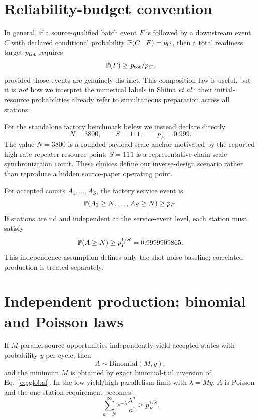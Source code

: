 \documentclass[aps,prx,reprint,superscriptaddress,nofootinbib,longbibliography,floatfix]{revtex4-2}
\begin{document}
\section{Reliability-budget convention}
In general, if a source-qualified batch event $F$ is followed by a downstream event $C$ with declared conditional probability $\mathbb P(C\mid F)=p_C$, then a total readiness target $p_{\rm tot}$ requires
\begin{equation}
\mathbb P(F)\ge p_{\rm tot}/p_C,
\end{equation}
provided those events are genuinely distinct. This composition law is useful, but it is \emph{not} how we interpret the numerical labels in Shiina \emph{et al.}: their initial-resource probabilities already refer to simultaneous preparation across all stations.

For the standalone factory benchmark below we instead declare directly
\begin{equation}
N=3800,\qquad S=111,\qquad p_F=0.999.
\end{equation}
The value $N=3800$ is a rounded payload-scale anchor motivated by the reported high-rate repeater resource point; $S=111$ is a representative chain-scale synchronization count. These choices define our inverse-design scenario rather than reproduce a hidden source-paper operating point.

For accepted counts $A_1,\ldots,A_S$, the factory service event is
\begin{equation}
\mathbb P(A_1\ge N,\ldots,A_S\ge N)\ge p_F.
\label{eq:global}
\end{equation}
If stations are iid and independent at the service-event level, each station must satisfy
\begin{equation}
\mathbb P(A\ge N)\ge p_F^{1/S}=0.9999909865.
\end{equation}
This independence assumption defines only the shot-noise baseline; correlated production is treated separately.

\section{Independent production: binomial and Poisson laws}
If $M$ parallel source opportunities independently yield accepted states with probability $y$ per cycle, then
\begin{equation}
A\sim\mathrm{Binomial}(M,y),
\end{equation}
and the minimum $M$ is obtained by exact binomial-tail inversion of Eq.~\eqref{eq:global}. In the low-yield/high-parallelism limit with $\lambda=My$, $A$ is Poisson and the one-station requirement becomes
\begin{equation}
\sum_{a=N}^{\infty}e^{-\lambda}\frac{\lambda^a}{a!}\ge p_F^{1/S}.
\label{eq:poisson}
\end{equation}
\end{document}
